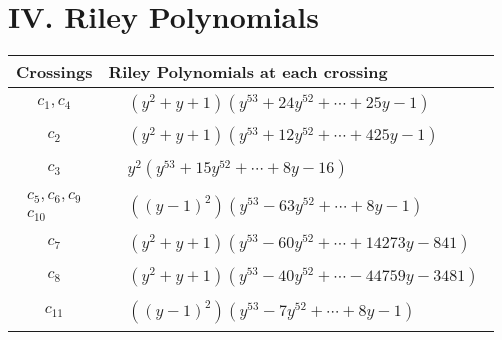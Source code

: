 \documentclass[1p]{elsarticle_modified}
\theoremstyle{definition}
\begin{document}
\centering \section*{ IV. Riley Polynomials}
\begin{tabular}{m{50pt}|m{274pt}}
Crossings & \hspace{64pt}Riley Polynomials at each crossing \\
\hline $$\begin{aligned}c_{1},c_{4}\end{aligned}$$&$\begin{aligned}
&(y^2+y+1)(y^{53}+24 y^{52}+\cdots+25 y-1)
\end{aligned}$\\
\hline $$\begin{aligned}c_{2}\end{aligned}$$&$\begin{aligned}
&(y^2+y+1)(y^{53}+12 y^{52}+\cdots+425 y-1)
\end{aligned}$\\
\hline $$\begin{aligned}c_{3}\end{aligned}$$&$\begin{aligned}
&y^2(y^{53}+15 y^{52}+\cdots+8 y-16)
\end{aligned}$\\
\hline $$\begin{aligned}c_{5},c_{6},c_{9}\\c_{10}\end{aligned}$$&$\begin{aligned}
&((y-1)^2)(y^{53}-63 y^{52}+\cdots+8 y-1)
\end{aligned}$\\
\hline $$\begin{aligned}c_{7}\end{aligned}$$&$\begin{aligned}
&(y^2+y+1)(y^{53}-60 y^{52}+\cdots+14273 y-841)
\end{aligned}$\\
\hline $$\begin{aligned}c_{8}\end{aligned}$$&$\begin{aligned}
&(y^2+y+1)(y^{53}-40 y^{52}+\cdots-44759 y-3481)
\end{aligned}$\\
\hline $$\begin{aligned}c_{11}\end{aligned}$$&$\begin{aligned}
&((y-1)^2)(y^{53}-7 y^{52}+\cdots+8 y-1)
\end{aligned}$\\
\hline
\end{tabular}
\vskip 2pc
\end{document}
